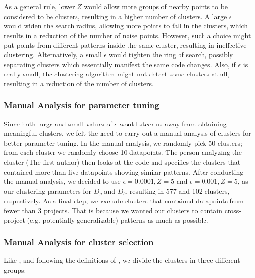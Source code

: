 As a general rule, lower $Z$ would allow more groups of nearby points to be considered to be clusters, resulting in a higher number of clusters. A large $\epsilon$ would widen the search radius, allowing more points to fall in the clusters, which results in a reduction of the number of noise points. However, such a choice might put points from different patterns inside the same cluster, resulting in ineffective clustering. Alternatively, a small $\epsilon$ would tighten the ring of search, possibly separating clusters which essentially manifest the same code changes. Also, if $\epsilon$ is really small, the clustering algorithm might not detect some clusters at all, resulting in a reduction of the number of clusters. 

\subsubsection{\label{sec:manual_analysis_parameter_tuning}Manual Analysis for parameter tuning}

Since both large and small values of $\epsilon$ would steer us away from obtaining meaningful clusters, we felt the need to carry out a manual analysis of clusters for better parameter tuning. In the manual analysis, we randomly pick 50 clusters; from each cluster we randomly choose 10 datapoints. The person analyzing the cluster (The first author) then looks at the code and specifies the clusters that contained more than five datapoints showing similar patterns. After conducting the manual analysis, we decided to use $\epsilon=0.0001, Z=5$ and $\epsilon=0.001, Z=5$, as our clustering parameters for $D_g$ and $D_b$, resulting in 577 and 102 clusters, respectively. As a final step, we exclude clusters that contained datapoints from fewer than 3 projects. That is because we wanted our clusters to contain cross-project (e.g. potentially generalizable) patterns as much as possible.  

\subsubsection{\label{sec:manual_analysis_cluster_selection}Manual Analysis for cluster selection}

Like \cite{yang2022mining}, and following the definitions of \cite{cotroneo2019analyzing}, we divide the clusters in three different groups:

